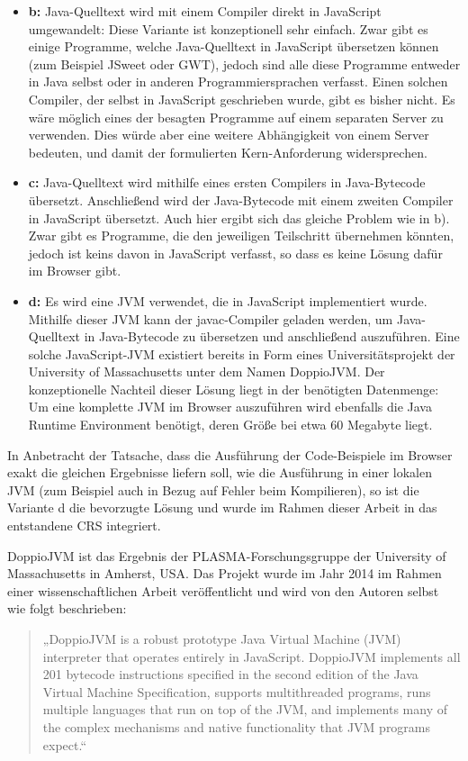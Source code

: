 \begin{itemize}
    \item \textbf{b:} Java-Quelltext wird mit einem Compiler direkt in JavaScript umgewandelt: Diese Variante ist konzeptionell sehr einfach. Zwar gibt es einige Programme, welche Java-Quelltext in JavaScript übersetzen können (zum Beispiel JSweet oder GWT), jedoch sind alle diese Programme entweder in Java selbst oder in anderen Programmiersprachen verfasst. Einen solchen Compiler, der selbst in JavaScript geschrieben wurde, gibt es bisher nicht. Es wäre möglich eines der besagten Programme auf einem separaten Server zu verwenden. Dies würde aber eine weitere Abhängigkeit von einem Server bedeuten, und damit der formulierten Kern-Anforderung widersprechen.
    \item \textbf{c:} Java-Quelltext wird mithilfe eines ersten Compilers in Java-Bytecode übersetzt. Anschließend wird der Java-Bytecode mit einem zweiten Compiler in JavaScript übersetzt. Auch hier ergibt sich das gleiche Problem wie in b). Zwar gibt es Programme, die den jeweiligen Teilschritt übernehmen könnten, jedoch ist keins davon in JavaScript verfasst, so dass es keine Lösung dafür im Browser gibt.
    \item \textbf{d:} Es wird eine JVM verwendet, die in JavaScript implementiert wurde. Mithilfe dieser JVM kann der javac-Compiler geladen werden, um Java-Quelltext in Java-Bytecode zu übersetzen und anschließend auszuführen. Eine solche JavaScript-JVM existiert bereits in Form eines Universitätsprojekt der University of Massachusetts unter dem Namen DoppioJVM. Der konzeptionelle Nachteil dieser Lösung liegt in der benötigten Datenmenge: Um eine komplette JVM im Browser auszuführen wird ebenfalls die Java Runtime Environment benötigt, deren Größe bei etwa 60 Megabyte liegt.
\end{itemize}

In Anbetracht der Tatsache, dass die Ausführung der Code-Beispiele im Browser exakt die gleichen Ergebnisse liefern soll, wie die Ausführung in einer lokalen JVM (zum Beispiel auch in Bezug auf Fehler beim Kompilieren), so ist die Variante d die bevorzugte Lösung und wurde im Rahmen dieser Arbeit in das entstandene CRS integriert.

DoppioJVM ist das Ergebnis der PLASMA-Forschungsgruppe der University of Massachusetts in Amherst, USA. Das Projekt wurde im Jahr 2014 im Rahmen einer wissenschaftlichen Arbeit veröffentlicht und wird von den Autoren selbst wie folgt beschrieben:

\begin{quotation}
„DoppioJVM is a robust prototype Java Virtual Machine (JVM) interpreter
that operates entirely in JavaScript. DoppioJVM implements all
201 bytecode instructions specified in the second edition of the
Java Virtual Machine Specification, supports multithreaded
programs, runs multiple languages that run on top of the JVM, and
implements many of the complex mechanisms and native functionality that JVM programs expect.“
\end{quotation}

